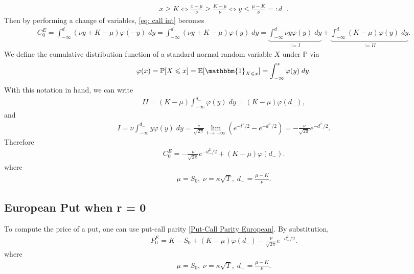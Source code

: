 \documentclass[reqno]{amsart}
\begin{document}
\begin{align}
	 x \ge K \Longleftrightarrow \frac{x-\mu}{\nu} \ge \frac{K - \mu}{\nu} \Longleftrightarrow y \le \frac{\mu - K}{\nu} =: d_-.
\end{align}
Then by performing a change of variables, \eqref{eq: call int} becomes 
\begin{align}
	 C^E_0 = \int_{-\infty}^{d_-} (\nu y + K - \mu) \varphi(-y) \; dy = \int_{-\infty}^{d_-} (\nu y + K - \mu) \varphi(y) \; dy = \underbrace{\int_{-\infty}^{d_-} \nu y \varphi(y) \; dy}_{:= I} + \underbrace{\int_{-\infty}^{d_-}  (K-\mu)\varphi(y) \; dy}_{:= II}.
\end{align}
We define the cumulative distribution function of a standard normal random variable $X$ under $\mathbb{P}$ via 
\begin{align}
	 \varphi(x) = \mathbb{P}[X \le x] = \E[ \mathbbm{1}_{X \le x}] = \int_{-\infty}^x \varphi(y) \; dy.
\end{align}
With this notation in hand, we can write 
\begin{align}
	 II = (K-\mu) \int_{-\infty}^{d_-} \varphi(y) \; dy = (K-\mu) \varphi(d_-),
\end{align}
and 
\begin{align}
	 I = \nu \int_{-\infty}^{d_-} y \varphi(y) \; dy =  \frac{\nu}{\sqrt{2\pi}} \lim_{t \to -\infty} (e^{-t^2/2} - e^{-d_-^2/2}) = -\frac{\nu}{\sqrt{2\pi}} e^{-d_-^2/2}.
\end{align}
Therefore 
\begin{align}
	 C^E_0 =  -\frac{\nu}{\sqrt{2\pi}} e^{-d_-^2/2} + (K-\mu) \varphi(d_-).
\end{align}
where 
\begin{align}
     \mu = S_0, \; \nu = \kappa \sqrt{T}, \; d_- = \frac{\mu - K}{\nu}.
\end{align}

\subsection{European Put when r = 0}
To compute the price of a put, one can use put-call parity \eqref{Put-Call Parity European}. 
By substitution, 
\begin{align}
     P^E_0 = K - S_0 + (K-\mu) \varphi(d_-) - \frac{\nu}{\sqrt{2\pi}} e^{-d_-^2/2}.
\end{align}
where 
\begin{align}
	 \mu = S_0, \; \nu = \kappa \sqrt{T}, \; d_- = \frac{\mu - K}{\nu}.
\end{align}
\end{document}
